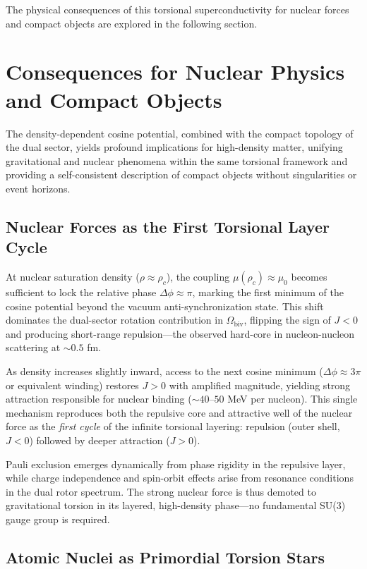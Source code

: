 \documentclass[a4paper]{article}
\begin{document}
The physical consequences of this torsional superconductivity for nuclear forces and compact objects are explored in the following section.

\section{Consequences for Nuclear Physics and Compact Objects}
\label{sec:consequences}

The density-dependent cosine potential, combined with the compact topology of the dual sector, yields profound implications for high-density matter, unifying gravitational and nuclear phenomena within the same torsional framework and providing a self-consistent description of compact objects without singularities or event horizons.

\subsection{Nuclear Forces as the First Torsional Layer Cycle}

At nuclear saturation density ($\rho \approx \rho_c$), the coupling $\mu(\rho_c) \approx \mu_0$ becomes sufficient to lock the relative phase $\Delta\phi \approx \pi$, marking the first minimum of the cosine potential beyond the vacuum anti-synchronization state. This shift dominates the dual-sector rotation contribution in $\Omega_\text{biv}$, flipping the sign of $J < 0$ and producing short-range repulsion—the observed hard-core in nucleon-nucleon scattering at $\sim 0.5$ fm.

As density increases slightly inward, access to the next cosine minimum ($\Delta\phi \approx 3\pi$ or equivalent winding) restores $J > 0$ with amplified magnitude, yielding strong attraction responsible for nuclear binding ($\sim 40$--$50$ MeV per nucleon). This single mechanism reproduces both the repulsive core and attractive well of the nuclear force as the \emph{first cycle} of the infinite torsional layering: repulsion (outer shell, $J < 0$) followed by deeper attraction ($J > 0$).

Pauli exclusion emerges dynamically from phase rigidity in the repulsive layer, while charge independence and spin-orbit effects arise from resonance conditions in the dual rotor spectrum. The strong nuclear force is thus demoted to gravitational torsion in its layered, high-density phase—no fundamental SU(3) gauge group is required.

\subsection{Atomic Nuclei as Primordial Torsion Stars}
\end{document}

